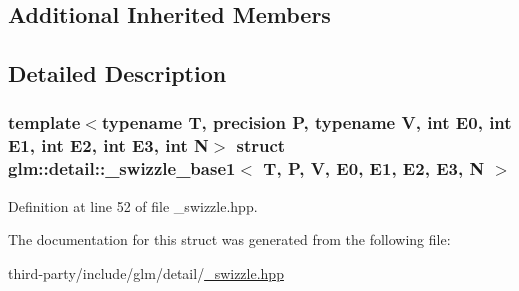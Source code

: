 \subsection*{Additional Inherited Members}


\subsection{Detailed Description}
\subsubsection*{template$<$typename T, precision P, typename V, int E0, int E1, int E2, int E3, int N$>$\newline
struct glm\+::detail\+::\+\_\+swizzle\+\_\+base1$<$ T, P, V, E0, E1, E2, E3, N $>$}



Definition at line 52 of file \+\_\+swizzle.\+hpp.



The documentation for this struct was generated from the following file\+:\begin{DoxyCompactItemize}
\item 
third-\/party/include/glm/detail/\hyperlink{__swizzle_8hpp}{\+\_\+swizzle.\+hpp}\end{DoxyCompactItemize}
